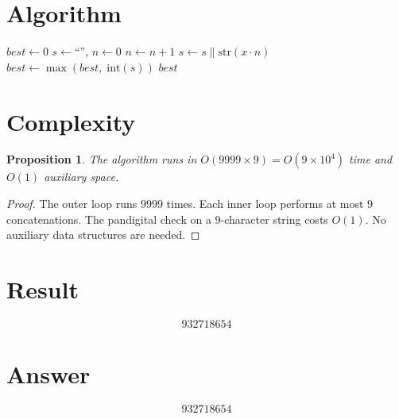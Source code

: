\documentclass[12pt]{article}
\newtheorem{proposition}[theorem]{Proposition}
\theoremstyle{definition}
\begin{document}
\section{Algorithm}

\begin{algorithmic}[1]
    \State $\mathit{best} \gets 0$
        \State $s \gets \text{``''}$, $n \gets 0$
            \State $n \gets n + 1$
            \State $s \gets s \| \mathrm{str}(x \cdot n)$
        \EndWhile
            \State $\mathit{best} \gets \max(\mathit{best},\; \mathrm{int}(s))$
        \EndIf
    \EndFor
    \State \Return $\mathit{best}$
\EndFunction
\end{algorithmic}

\section{Complexity}

\begin{proposition}
The algorithm runs in $O(9999 \times 9) = O(9 \times 10^4)$ time and $O(1)$ auxiliary space.
\end{proposition}
\begin{proof}
The outer loop runs $9999$ times. Each inner loop performs at most $9$ concatenations. The pandigital check on a $9$-character string costs $O(1)$. No auxiliary data structures are needed.
\end{proof}

\section{Result}
\[
    \boxed{932718654}
\]

\section{Answer}

\[
\boxed{932718654}
\]
\end{document}
